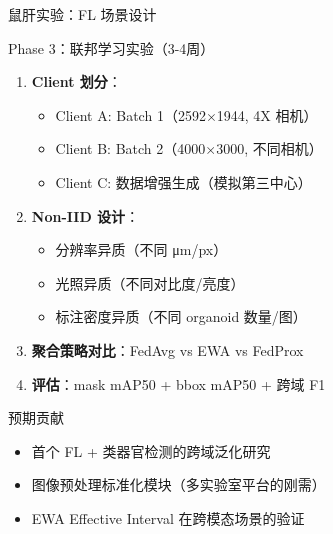 \documentclass[aspectratio=169, 10pt]{beamer}
\begin{document}
\begin{frame}{鼠肝实验：FL 场景设计}
  \begin{block}{Phase 3：联邦学习实验（3-4周）}
    \begin{enumerate}
      \item \textbf{Client 划分}：
        \begin{itemize}
          \item Client A: Batch 1（2592$\times$1944, 4X 相机）
          \item Client B: Batch 2（4000$\times$3000, 不同相机）
          \item Client C: 数据增强生成（模拟第三中心）
        \end{itemize}
      \item \textbf{Non-IID 设计}：
        \begin{itemize}
          \item 分辨率异质（不同 μm/px）
          \item 光照异质（不同对比度/亮度）
          \item 标注密度异质（不同 organoid 数量/图）
        \end{itemize}
      \item \textbf{聚合策略对比}：FedAvg vs EWA vs FedProx
      \item \textbf{评估}：mask mAP50 + bbox mAP50 + 跨域 F1
    \end{enumerate}
  \end{block}
  \vspace{0em}
  \begin{alertblock}{预期贡献}
    \begin{itemize}
      \item 首个 FL + 类器官检测的跨域泛化研究
      \item 图像预处理标准化模块（多实验室平台的刚需）
      \item EWA Effective Interval 在跨模态场景的验证
    \end{itemize}
  \end{alertblock}
\end{frame}
\end{document}
